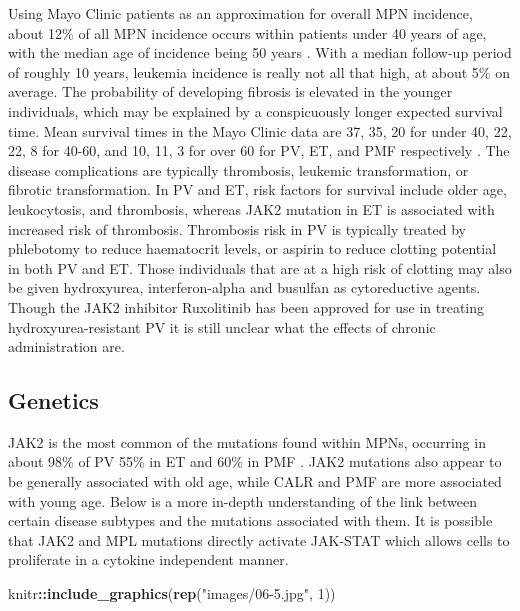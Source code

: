 \documentclass[]{book}
\newenvironment{Shaded}{\begin{snugshade}}{\end{snugshade}}
\newcommand{\KeywordTok}[1]{\textcolor[rgb]{0.13,0.29,0.53}{\textbf{#1}}}
\newcommand{\DecValTok}[1]{\textcolor[rgb]{0.00,0.00,0.81}{#1}}
\newcommand{\StringTok}[1]{\textcolor[rgb]{0.31,0.60,0.02}{#1}}
\newcommand{\OperatorTok}[1]{\textcolor[rgb]{0.81,0.36,0.00}{\textbf{#1}}}
\newcommand{\NormalTok}[1]{#1}
\begin{document}
\citep{grinfeld2018classification}

Using Mayo Clinic patients as an approximation for overall MPN
incidence, about 12\% of all MPN incidence occurs within patients under
40 years of age, with the median age of incidence being 50 years
\citep{szuber2018myeloproliferative}. With a median follow-up period of
roughly 10 years, leukemia incidence is really not all that high, at
about 5\% on average. The probability of developing fibrosis is elevated
in the younger individuals, which may be explained by a conspicuously
longer expected survival time. Mean survival times in the Mayo Clinic
data are 37, 35, 20 for under 40, 22, 22, 8 for 40-60, and 10, 11, 3 for
over 60 for PV, ET, and PMF respectively
\citep{szuber2018myeloproliferative, tefferi2015myeloproliferative}. The
disease complications are typically thrombosis, leukemic transformation,
or fibrotic transformation. In PV and ET, risk factors for survival
include older age, leukocytosis, and thrombosis, whereas JAK2 mutation
in ET is associated with increased risk of thrombosis. Thrombosis risk
in PV is typically treated by phlebotomy to reduce haematocrit levels,
or aspirin to reduce clotting potential in both PV and ET. Those
individuals that are at a high risk of clotting may also be given
hydroxyurea, interferon-alpha and busulfan as cytoreductive agents.
Though the JAK2 inhibitor Ruxolitinib has been approved for use in
treating hydroxyurea-resistant PV it is still unclear what the effects
of chronic administration are.

\subsection{Genetics}\label{genetics}

JAK2 is the most common of the mutations found within MPNs, occurring in
about 98\% of PV 55\% in ET and 60\% in PMF
\citep{tefferi2015myeloproliferative}. JAK2 mutations also appear to be
generally associated with old age, while CALR and PMF are more
associated with young age. Below is a more in-depth understanding of the
link between certain disease subtypes and the mutations associated with
them. It is possible that JAK2 and MPL mutations directly activate
JAK-STAT which allows cells to proliferate in a cytokine independent
manner.

\begin{Shaded}
\begin{Highlighting}[]
\NormalTok{knitr}\OperatorTok{::}\KeywordTok{include_graphics}\NormalTok{(}\KeywordTok{rep}\NormalTok{(}\StringTok{"images/06-5.jpg"}\NormalTok{, }\DecValTok{1}\NormalTok{))          }
\end{Highlighting}
\end{Shaded}
\end{document}
